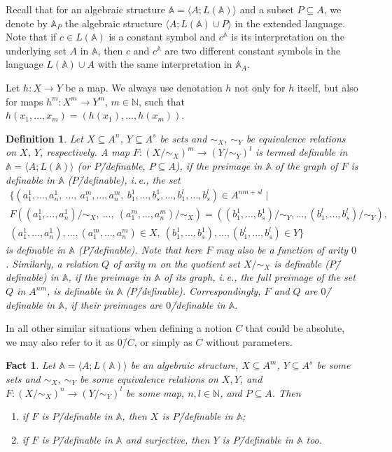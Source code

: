 \documentclass[12pt]{article}
\newtheorem{fact}{Fact}
\newtheorem{definition}{Definition}
\theoremstyle{definition}
\def\N{{\mathbb{N}}}
\def\MA{{\mathbb{A}}}
\begin{document}
Recall that for an algebraic structure $\MA=\langle A; L(\MA)\rangle$ and a subset $P\subseteq A$, we denote by $\MA_P$ the algebraic structure $\langle A; L(\MA)\cup P\rangle$ in the extended language. Note that if $c\in L(\MA)$ is a constant symbol and $c^\MA$ is its interpretation on the underlying set $A$ in $\MA$, then $c$ and $c^\MA$ are two different constant symbols in the language $L(\MA)\cup A$ with the same interpretation in $\MA_A$.

Let $h\colon X\to Y$ be a map. We always use denotation $h$ not only for $h$ itself, but also for maps $h^m\colon X^m\to Y^m$, $m\in \N$, such that $h(x_1,\ldots,x_m)=(h(x_1),\ldots,h(x_m))$.

\begin{definition}\label{def:definable_map}
Let $X\subseteq A^n$, $Y\subseteq A^s$ be sets and $\sim_X$, $\sim_Y$ be equivalence relations on $X$, $Y$, respectively. A map $F\colon (X/{\sim_X})^m\to (Y/{\sim_Y})^l$ is termed {\em definable} in $\MA=\langle A; L(\MA)\rangle$ (or $P$\=/definable, $P\subseteq A$), if the preimage in $\MA$ of the graph of $F$ is definable in $\MA$ ($P$\=/definable), i.\,e., the set 
\begin{multline*}
\{(a^1_1,\ldots,a^1_n,\:\ldots,\: a^m_1,\ldots,a^m_n,\: b^1_1,\ldots, b^1_s,\ldots,b^l_1,\ldots,b^l_s) \in A^{nm+sl}\mid  \\ 
F((a^1_1,\ldots,a^1_n)/{\sim_X},\:\ldots,\: (a^m_1,\ldots,a^m_n)/{\sim_X})=((b^1_1,\ldots,b^1_s)/{
\sim_Y},\ldots,(b^l_1,\ldots,b^l_s)/{
\sim_Y}),\\
(a^1_1,\ldots,a^1_n),\ldots, (a^m_1,\ldots,a^m_n)\in X, \: (b^1_1,\ldots,b^1_s),\ldots,(b^l_1,\ldots,b^l_s)\in Y\}
\end{multline*}
is definable in $\MA$ ($P$\=/definable).  Note that here $F$ may also be a function of arity $0$. Similarly, a relation $Q$ of arity $m$ on the quotient set $X/{\sim_X}$ is {\em definable} ($P$\=/definable) in $\MA$, if the {\em preimage in $\MA$ of its graph}, i.\,e., the full preimage of the set $Q$ in $A^{nm}$, is definable in $\MA$ ($P$\=/definable). Correspondingly, $F$ and $Q$ are $0$\=/{\em definable} in $\MA$, if their preimages  are $0$\=/definable in $\MA$.
\end{definition}

In all other similar situations when defining a notion $C$ that could be absolute, we may also refer to it as $0$\=/$C$, or simply as $C$ without parameters.

\begin{fact}\label{rem0}
Let $\MA=\langle A; L(\MA)\rangle$ be an algebraic structure, $X\subseteq A^m$, $Y\subseteq A^s$ be some sets and $\sim_X$, $\sim_Y$ be some equivalence relations on $X, Y$, and $F\colon (X/{\sim_X})^n\to (Y/{\sim_Y})^l$ be some map, $n,l\in\N$, and $P\subseteq A$. Then
\begin{enumerate}[label=\alph*)]
    \item if $F$ is $P$\=/definable in $\MA$, then $X$ is $P$\=/definable in $\MA$;
    \item if $F$ is $P$\=/definable in $\MA$ and surjective, then $Y$ is $P$\=/definable in $\MA$ too.
\end{enumerate}
\end{fact}
\end{document}
